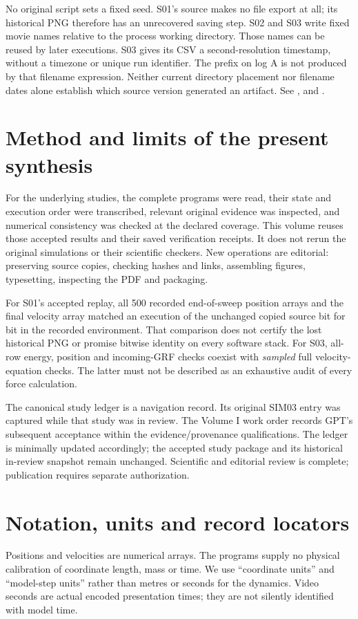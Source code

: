 No original script sets a fixed seed. S01's source makes no file export at
all; its historical PNG therefore has an unrecovered saving step. S02 and
S03 write fixed movie names relative to the process working directory.
Those names can be reused by later executions. S03 gives its CSV a
second-resolution timestamp, without a timezone or unique run identifier.
The  prefix on log A is not produced by that filename
expression. Neither current directory placement nor filename dates alone
establish which source version generated an artifact.
See ,  and .

\section{Method and limits of the present synthesis}
For the underlying studies, the complete programs were read, their state and
execution order were transcribed, relevant original evidence was inspected,
and numerical consistency was checked at the declared coverage. This volume
reuses those accepted results and their saved verification receipts.
It does not rerun the original simulations or their scientific checkers.
New operations are editorial: preserving source copies, checking hashes and
links, assembling figures, typesetting, inspecting the PDF and packaging.

For S01's accepted replay, all 500 recorded end-of-sweep position arrays and
the final velocity array matched an execution of the unchanged copied source
bit for bit in the recorded environment. That comparison does not certify
the lost historical PNG or promise bitwise identity on every software stack.
For S03, all-row energy, position and incoming-GRF checks coexist with
\emph{sampled} full velocity-equation checks. The latter must not be described
as an exhaustive audit of every force calculation.
\cite{replay01,study03} 

The canonical study ledger is a navigation record. Its original SIM03 entry
was captured while that study was in review. The Volume I work order records
GPT's subsequent acceptance within the evidence/provenance qualifications.
The ledger is minimally updated accordingly; the accepted study package and
its historical in-review snapshot remain unchanged. Scientific and editorial
review is complete; publication requires separate authorization. 

\section{Notation, units and record locators}
Positions and velocities are numerical arrays. The programs supply no
physical calibration of coordinate length, mass or time. We use
“coordinate units” and “model-step units” rather than metres or seconds
for the dynamics. Video seconds are actual encoded presentation times;
they are not silently identified with model time.

